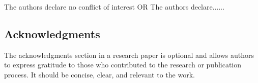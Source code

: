 \documentclass[twoside, 11pt]{article}
\begin{document}
\vspace{-0.2cm}
The authors declare no conflict of interest OR  The authors declare......
\vspace{-0.05cm}

\subsection*{Acknowledgments}
 The acknowledgments section in a research paper is optional and allows authors to express gratitude to those who contributed to the research or publication process. It should be concise, clear, and relevant to the work.

 
 


\printbibliography
\end{document}
